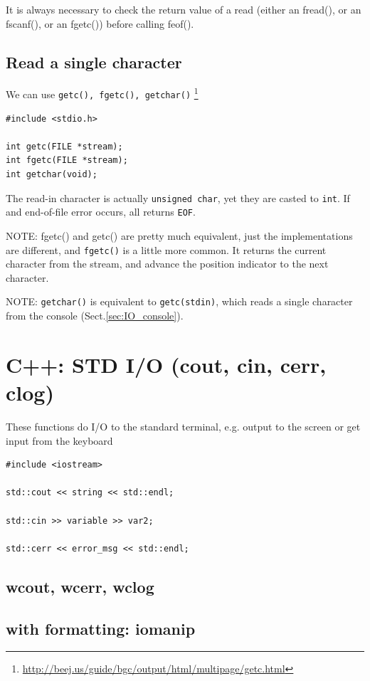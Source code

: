 It is always necessary to check the return value of a read (either an fread(),
or an fscanf(), or an fgetc()) before calling feof().

\subsection{Read a single character}

We can use \verb!getc(), fgetc(), getchar()!
\footnote{\url{http://beej.us/guide/bgc/output/html/multipage/getc.html}}
\begin{verbatim}
#include <stdio.h>

int getc(FILE *stream);
int fgetc(FILE *stream);
int getchar(void);
\end{verbatim}
The read-in character is actually \verb!unsigned char!, yet they are casted to
\verb!int!. If and end-of-file error occurs, all returns \verb!EOF!.

NOTE: fgetc() and getc() are pretty much equivalent, just the implementations
are different, and \verb!fgetc()! is a little more common. It returns the
current character from the stream, and advance the position indicator to the
next character.

NOTE: \verb!getchar()! is equivalent to \verb!getc(stdin)!, which reads a single
character from the console (Sect.\ref{sec:IO_console}).

\section{C++: STD I/O (cout, cin, cerr, clog)}
\label{sec:std_io}

These functions do I/O to the standard terminal, e.g. output to the screen
or get input from the keyboard

\begin{verbatim}
#include <iostream>

std::cout << string << std::endl;

std::cin >> variable >> var2;

std::cerr << error_msg << std::endl;
\end{verbatim}

\subsection{wcout, wcerr, wclog}



\subsection{with formatting: iomanip}
\label{sec:iomanip}

